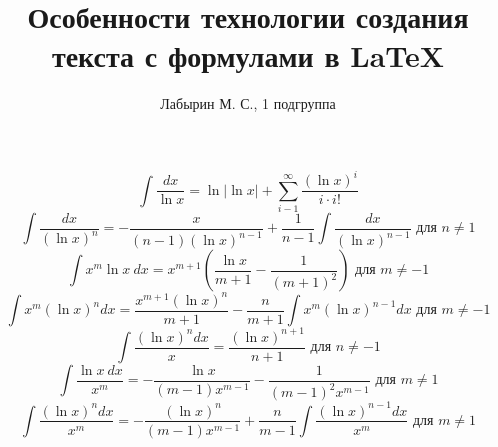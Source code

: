 \documentclass[12pt]{article}
\author{Лабырин М. С., 1 подгруппа}
\title{Особенности технологии создания\\текста с формулами в \LaTeX}
\begin{document}
\maketitle

\[
  \int \frac{dx}{\ln x} =
  \ln |\ln x|
  + \sum^{\infty}_{i-1} \frac{{(\ln x)}^i}{i \cdot i!}
\]
\[
  \int \frac{dx}{{(\ln x)}^n} =
  - \frac{x}{(n - 1){(\ln x)}^{n - 1}}
  + \frac{1}{n - 1} \int \frac{dx}{{(\ln x)}^{n - 1}}
  \textrm{ для }
  n \neq 1
\]
\[
  \int x^m \ln x~dx =
  x^{m + 1} \left(
  \frac{\ln x}{m + 1}
  - \frac{1}{{(m + 1)}^2}
  \right)
  \textrm{ для }
  m \neq -1
\]
\[
  \int x^m {(\ln x)}^n dx =
  \frac{x^{m + 1} {(\ln x)}^n}{m + 1}
  - \frac{n}{m + 1} \int x^m {(\ln x)}^{n - 1} dx
  \textrm{ для }
  m \neq -1
\]
\[
  \int \frac{{(\ln x)}^n dx}{x} =
  \frac{{(\ln x)}^{n + 1}}{n + 1}
  \textrm{ для }
  n \neq -1
\]
\[
  \int \frac{\ln x~dx}{x^m} =
  - \frac{\ln x}{(m - 1) x^{m - 1}}
  - \frac{1}{{(m - 1)}^2 x^{m - 1}}
  \textrm{ для }
  m \neq 1
\]
\[
  \int \frac{{(\ln x)}^n dx}{x^m} =
  - \frac{{(\ln x)}^n}{(m - 1) x^{m - 1}}
  + \frac{n}{m - 1} \int \frac{{(\ln x)}^{n - 1} dx}{x^m}
  \textrm{ для }
  m \neq 1
\]
\end{document}
